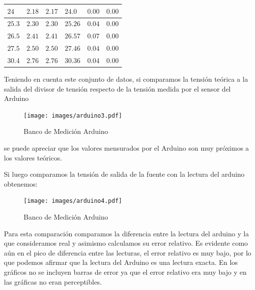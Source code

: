 \documentclass[12pt,a4paper]{article}
\begin{document}
\begin{center}
{\begin{tabular}{ |l|l|l|l|l|l| }
				$ 24    $ & $2.18$ & $2.17$ & $24.0  $ & $ 0.00  $  & $  0.00 $\\ \hline                                                                 
				$ 25.3  $ & $2.30$ & $2.30$ & $25.26 $ & $ 0.04  $  & $  0.00 $\\ \hline                                                                 
				$ 26.5  $ & $2.41$ & $2.41$ & $26.57 $ & $ 0.07  $  & $  0.00 $\\ \hline                                                                   
				$ 27.5  $ & $2.50$ & $2.50$ & $27.46 $ & $ 0.04  $  & $  0.00 $\\ \hline                                                                
				$ 30.4  $ & $2.76$ & $2.76$ & $30.36 $ & $ 0.04  $  & $  0.00 $\\ \hline                                                                  

 				
				
			\end{tabular}}\label{tab:medarduino}
			\end{center}

			Teniendo en cuenta este conjunto de datos, si comparamos la tensión teórica a la salida del divisor de tensión respecto de la tensión medida por el sensor del Arduino

			\begin{figure}[H]
			\centering
				\texttt{[image: images/arduino3.pdf]}\caption{Banco de Medición Arduino}
			\end{figure}
			se puede apreciar que los valores mensurados por el Arduino son muy próximos a los valores teóricos.

			Si luego comparamos la tensión de salida de la fuente con la lectura del arduino obtenemos:

			\begin{figure}[H]
			\centering
				\texttt{[image: images/arduino4.pdf]}\caption{Banco de Medición Arduino}
			\end{figure}

			Para esta comparación comparamos la diferencia entre la lectura del arduino y la que consideramos real y asimismo calculamos su error relativo. Es evidente como aún en el pico de diferencia entre las lecturas, el error relativo es muy bajo, por lo que podemos afirmar que la lectura del Arduino es una lectura exacta. En los gráficos no se incluyen barras de error ya que el error relativo era muy bajo y en las gráficas no eran perceptibles.
\end{document}
